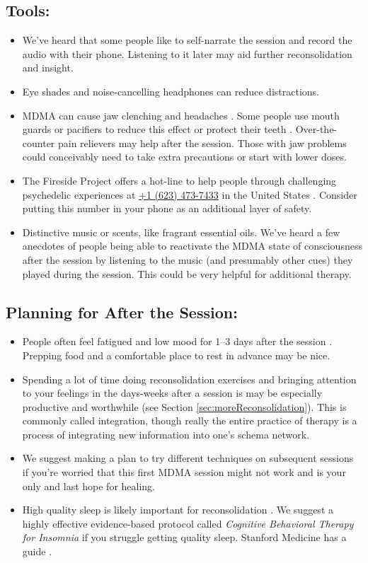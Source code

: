 \documentclass[12pt,letterpaper]{book}
\begin{document}
\subsection*{Tools:}
\begin{itemize}
    \item We've heard that some people like to self-narrate the session and record the audio with their phone. Listening to it later may aid further reconsolidation and insight.
    \item Eye shades and noise-cancelling headphones can reduce distractions.
    \item MDMA can cause jaw clenching and headaches \cite{mitchellMDMAClinicalTrial2,liechtiGender}. Some people use mouth guards or pacifiers to reduce this effect or protect their teeth \cite{emdeEmergency}. Over-the-counter pain relievers may help after the session. Those with jaw problems could conceivably need to take extra precautions or start with lower doses.
    \item The Fireside Project offers a hot-line to help people through challenging psychedelic experiences at \href{tel:1-623-473-7433}{+1 (623) 473-7433} in the United States \cite{firesideProject}. Consider putting this number in your phone as an additional layer of safety.
    \item Distinctive music or scents, like fragrant essential oils. We've heard a few anecdotes of people being able to reactivate the MDMA state of consciousness after the session by listening to the music (and presumably other cues) they played during the session. This could be very helpful for additional therapy.
\end{itemize}
\subsection*{Planning for After the Session:}
\begin{itemize}
    \item People often feel fatigued and low mood for 1–3 days after the session \cite{liechtiGender}. Prepping food and a comfortable place to rest in advance may be nice.
    \item Spending a lot of time doing reconsolidation exercises and bringing attention to your feelings in the days-weeks after a session is may be especially productive and worthwhile (see Section \ref{sec:moreReconsolidation}). This is commonly called integration, though really the entire practice of therapy is a process of integrating new information into one's schema network.
    \item We suggest making a plan to try different techniques on subsequent sessions if you're worried that this first MDMA session might not work and is your only and last hope for healing.
    \item High quality sleep is likely important for reconsolidation \cite{simon2020sleep}. We suggest a highly effective evidence-based protocol called \textit{Cognitive Behavioral Therapy for Insomnia} if you struggle getting quality sleep. Stanford Medicine has a guide \cite{stanfordSleep}.
\end{itemize}
\end{document}
